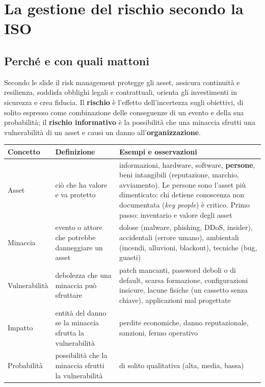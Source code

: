 \section{La gestione del rischio secondo la ISO}
\label{sec:iso-rischio}

\subsection{Perché e con quali mattoni}
Secondo le slide il risk management protegge gli asset, assicura continuità e resilienza, soddisfa obblighi
legali e contrattuali, orienta gli investimenti in sicurezza e crea fiducia. Il \textbf{rischio} è
l'effetto dell'incertezza sugli obiettivi, di solito espresso come combinazione delle conseguenze di un
evento e della sua probabilità; il \textbf{rischio informativo} è la possibilità che una minaccia sfrutti
una vulnerabilità di un asset e causi un danno all'\textbf{organizzazione}.

\begin{center}
\small
\begin{tabularx}{\linewidth}{>{\raggedright\arraybackslash}p{2.4cm} >{\raggedright\arraybackslash}p{4.2cm} X}
\toprule
\textbf{Concetto} & \textbf{Definizione} & \textbf{Esempi e osservazioni}\\
\midrule
Asset & ciò che ha valore e va protetto & informazioni, hardware, software, \textbf{persone}, beni intangibili
  (reputazione, marchio, avviamento). Le persone sono l'asset più dimenticato: chi detiene conoscenza non
  documentata (\emph{key people}) è critico. Primo passo: inventario e valore degli asset\\
Minaccia & evento o attore che potrebbe danneggiare un asset & dolose (malware, phishing, DDoS, insider),
  accidentali (errore umano), ambientali (incendi, alluvioni, blackout), tecniche (bug, guasti)\\
Vulnerabilità & debolezza che una minaccia può sfruttare & patch mancanti, password deboli o di default,
  scarsa formazione, configurazioni insicure, lacune fisiche (un cassetto senza chiave), applicazioni mal
  progettate\\
Impatto & entità del danno se la minaccia sfrutta la vulnerabilità & perdite economiche, danno reputazionale,
  sanzioni, fermo operativo\\
Probabilità & possibilità che la minaccia sfrutti la vulnerabilità & di solito qualitativa (alta, media,
  bassa)\\
\bottomrule
\end{tabularx}
\end{center}

